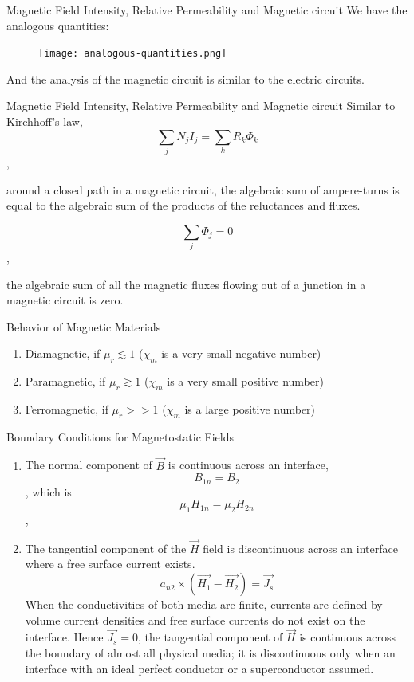 \documentclass[xcolor={dvipsnames}]{beamer}
\begin{document}
\begin{frame}{Magnetic Field Intensity, Relative Permeability and Magnetic circuit}
We have the analogous quantities:

\begin{figure}[H]
  \centering
  \texttt{[image: analogous-quantities.png]}
\end{figure}
And the analysis of the magnetic circuit is similar to the electric circuits.


\end{frame}
\begin{frame}{Magnetic Field Intensity, Relative Permeability and Magnetic circuit}
Similar to Kirchhoff's law, 
$$
\sum_j N_j I_j = \sum_k R_k \Phi_k
$$,

around a closed path in a magnetic circuit, the algebraic sum of ampere-turns is equal to the algebraic sum of the products of the reluctances and fluxes.

$$
\sum_j \Phi_j = 0
$$,

the algebraic sum of all the magnetic fluxes flowing out of a junction in a magnetic circuit is zero.
\end{frame}
\begin{frame}
\begin{block}{Behavior of Magnetic Materials}


\begin{enumerate}
  \item Diamagnetic, if $\mu_r \lesssim 1$ ($\chi_m$ is a very small negative number)
  \item Paramagnetic, if $\mu_r \gtrsim 1$ ($\chi_m$ is a very small positive number)
  \item Ferromagnetic, if $\mu_r >> 1$ ($\chi_m$ is a large positive number)  
\end{enumerate}
\end{block}
\end{frame}
\begin{frame}{Boundary Conditions for Magnetostatic Fields}
\begin{enumerate}
  \item The normal component of $\vec{B}$ is continuous across an interface,
  $$
  B_{1n} = B_{2}
  $$, which is 
  $$
  \mu_1 H_{1n} = \mu_2 H_{2n}
  $$,
  \item The tangential component of the $\vec{H}$ field is discontinuous across an interface where a free surface current exists.
  $$
a_{n2}\times (\vec{H_1} - \vec{H_2}) = \vec{J_s}
  $$
  When the conductivities of both media are finite, currents are defined by volume current densities and free surface currents do not exist on the interface. Hence $\vec{J_s} = 0$, the tangential component of $\vec{H}$ is continuous across the boundary of almost all physical media; it is discontinuous only when an interface with an ideal perfect conductor or a superconductor assumed. 
\end{enumerate}
\end{frame}
\end{document}
